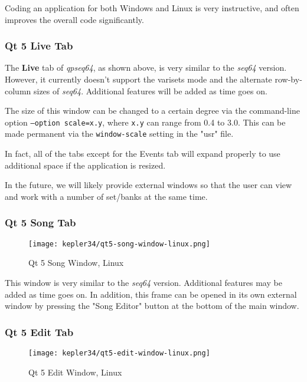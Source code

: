    Coding an application for both Windows and Linux is very instructive, and
   often improves the overall code significantly.

\subsubsection{Qt 5 Live Tab}
\label{subsubsec:qt_portmidi_qt5_live_tab}

   The \textbf{Live} tab of \textsl{qpseq64}, as shown above, is very similar
   to the \textsl{seq64} version.  However, it currently doesn't support the
   varisets mode and the alternate row-by-column sizes of \textsl{seq64}.
   Additional features will be added as time goes on.

   The size of this window can be changed to a certain degree via
   the command-line option \texttt{--option scale=x.y}, where \texttt{x.y} can
   range from 0.4 to 3.0.  This can be made permanent via the
   \texttt{window-scale} setting in the "usr" file.

   In fact, all of the tabs except for the Events tab will expand properly to
   use additional space if the application is resized.

   In the future, we will likely provide external windows so that the user can
   view and work with a number of set/banks at the same time.

\subsubsection{Qt 5 Song Tab}
\label{subsubsec:qt_portmidi_qt5_song_tab}

\begin{figure}[H]
   \centering 
   \texttt{[image: kepler34/qt5-song-window-linux.png]}
   \caption{Qt 5 Song Window, Linux}
   \label{fig:qt5_song_window_linux}
\end{figure}

   This window is very similar to the \textsl{seq64} version.
   Additional features may be added as time goes on.  In addition,
   this frame can be opened in its own external window by
   pressing the "Song Editor" button at the bottom of the main window.

\subsubsection{Qt 5 Edit Tab}
\label{subsubsec:qt_portmidi_qt5_edit_tab}

\begin{figure}[H]
   \centering 
   \texttt{[image: kepler34/qt5-edit-window-linux.png]}
   \caption{Qt 5 Edit Window, Linux}
   \label{fig:qt5_edit_window_linux}
\end{figure}

